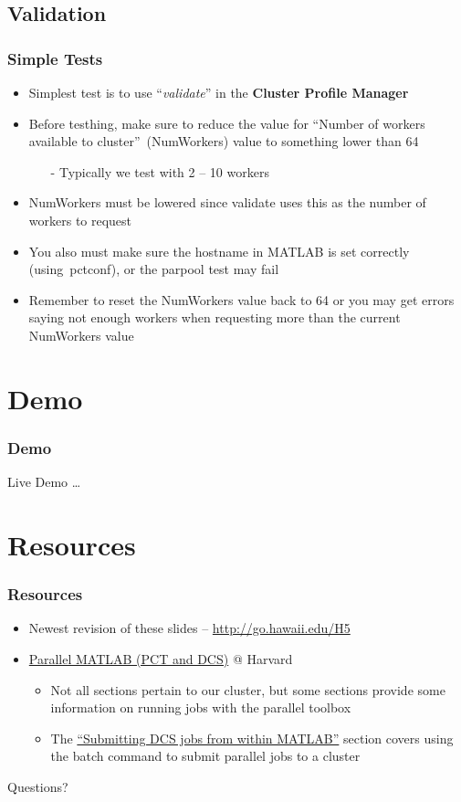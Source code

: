 \documentclass[t]{beamer}
\newcommand{\TOTWRKS}{64}
\begin{document}
\subsection{Validation}
\begin{frame}
\frametitle{Simple Tests}
\begin{itemize}
\item Simplest test is to use ``\emph{validate}'' in the \textbf{Cluster Profile Manager}
\item Before testhing, make sure to reduce the value for ``Number of workers available to cluster''~(NumWorkers) value to something lower than \TOTWRKS{}
  \begin{itemize}
  \item[-] Typically we test with 2 -- 10 workers
  \end{itemize}
\item NumWorkers must be lowered since validate uses this as the number of workers to request
\item You also must make sure the hostname in MATLAB is set correctly (using~pctconf), or the parpool test may fail
\item Remember to reset the NumWorkers value back to \TOTWRKS{} or you may get errors saying not enough workers when requesting more than the current NumWorkers value
\end{itemize}\end{frame}

\section{Demo}
\begin{frame}
\frametitle{Demo}
\huge{\centerline{Live Demo \ldots}}
\end{frame}

\section{Resources}
\begin{frame}
\frametitle{Resources}
\begin{itemize}
\item Newest revision of these slides -- \url{http://go.hawaii.edu/H5}
\item \href{https://rc.fas.harvard.edu/resources/documentation/software/parallel-matlab-pct-dcs/}{Parallel MATLAB (PCT and DCS)} @ Harvard
\begin{itemize}
	\item Not all sections pertain to our cluster, but some sections provide some information on running jobs with the parallel toolbox
	\item The \href{https://rc.fas.harvard.edu/resources/documentation/software/parallel-matlab-pct-dcs/\#Submitting_DCS_jobs_from_within_MATLAB}{``Submitting DCS jobs from within MATLAB''} section covers using the batch command to submit parallel jobs to a cluster
\end{itemize}
\end{itemize}
\end{frame}

\begin{frame}
\huge{\centerline{Questions?}}
\end{frame}

\end{document}
